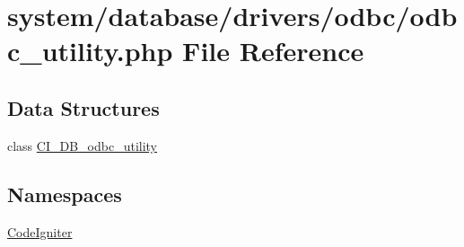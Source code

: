 \hypertarget{odbc__utility_8php}{\section{system/database/drivers/odbc/odbc\-\_\-utility.php File Reference}
\label{odbc__utility_8php}
}
\subsection*{Data Structures}
\begin{DoxyCompactItemize}
\item 
class \hyperlink{class_c_i___d_b__odbc__utility}{C\-I\-\_\-\-D\-B\-\_\-odbc\-\_\-utility}
\end{DoxyCompactItemize}
\subsection*{Namespaces}
\begin{DoxyCompactItemize}
\item 
\hyperlink{namespace_code_igniter}{Code\-Igniter}
\end{DoxyCompactItemize}
